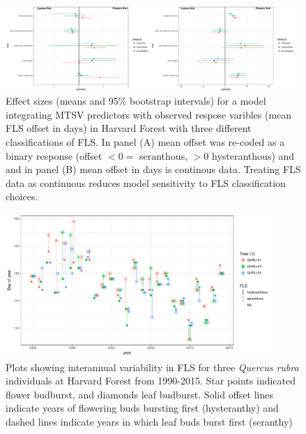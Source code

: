\documentclass[12pt]{article}\usepackage[]{graphicx}\usepackage[]{color}
\begin{document}
\begin{center}
\begin{figure}[here]
\includegraphics[width=0.98\textwidth]{..//figures/HF_con_v_bin_comp.pdf} %
\caption{Effect sizes (means and 95\% bootstrap intervals) for a model integrating MTSV predictors with observed respose varibles (mean FLS offset in days) in Harvard Forest with three different classifications of FLS. In panel (A) mean offset was re-coded as a binary response (offset $<0 =$ seranthous, $>0$ hysteranthous) and and in panel (B) mean offset in days is continous data. Treating FLS data as continuous reduces model sensitivity to FLS classification choices.}
\label{fig:Figure 2}
\end{figure}

\end{center}
\begin{center}
\begin{figure}[here]
\includegraphics[width=0.9\textwidth]{..//figures/HF_dissplot.pdf} %
\caption{Plots showing interannual variability in FLS for three \textit{Quercus rubra} individuals at Harvard Forest from 1990-2015. Star points indicated flower budburst, and diamonds leaf budburst. Solid offset lines indicate years of flowering buds bursting first (hysteranthy) and dashed lines indicate years in which leaf buds burst first (seranthy)}
\label{fig:Figure 3}
\end{figure}
\end{center}
\end{document}
